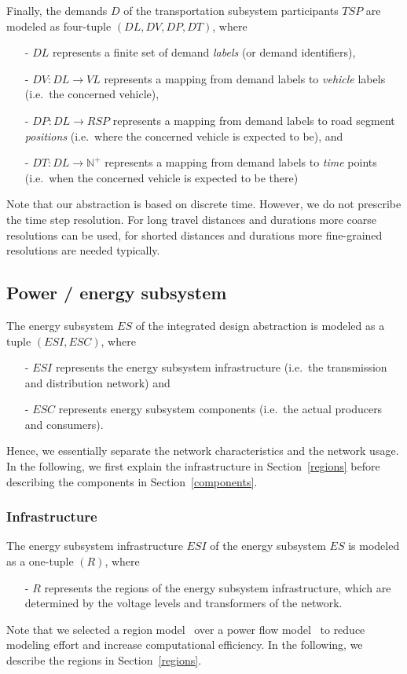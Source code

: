 Finally, the demands $D$ of the transportation subsystem participants $TSP$ are modeled as four-tuple $(DL, DV, DP, DT)$, where
\begin{itemize}
	\item[-] $DL$ represents a finite set of demand \textit{labels} (or demand identifiers),
	\item[-] $DV: DL \rightarrow VL$ represents a mapping from demand labels to \textit{vehicle} labels (i.e.\ the concerned vehicle),
	\item[-] $DP: DL \rightarrow RSP$ represents a mapping from demand labels to road segment \textit{positions} (i.e.\ where the concerned vehicle is expected to be), and
	\item[-] $DT: DL \rightarrow \mathbb{N}^+$ represents a mapping from demand labels to \textit{time} points (i.e.\ when the concerned vehicle is expected to be there)
\end{itemize}
Note that our abstraction is based on discrete time. However, we do not prescribe the time step resolution. For long travel distances and durations more coarse resolutions can be used, for shorted distances and durations more fine-grained resolutions are needed typically.

\subsection{Power / energy subsystem}
\label{energy_system}

The energy subsystem $ES$ of the integrated design abstraction is modeled as a tuple $(ESI, ESC)$, where
\begin{itemize}
	\item[-] $ESI$ represents the energy subsystem infrastructure (i.e.\ the transmission and distribution network) and
	\item[-] $ESC$ represents energy subsystem components (i.e.\ the actual producers and consumers).
\end{itemize}
Hence, we essentially separate the network characteristics and the network usage. In the following, we first explain the infrastructure in Section~\ref{regions} before describing the components in Section~\ref{components}.

\subsubsection{Infrastructure}
\label{energy_infrastructure}

The energy subsystem infrastructure $ESI$ of the energy subsystem $ES$ is modeled as a one-tuple $(R)$, where
\begin{itemize}
	\item[-] $R$ represents the regions of the energy subsystem infrastructure, which are determined by the voltage levels and transformers of the network.
\end{itemize}
Note that we selected a region model~\cite{Hackenberg2012} over a power flow model~\cite{Dommel1968} to reduce modeling effort and increase computational efficiency. In the following, we describe the regions in Section~\ref{regions}.

